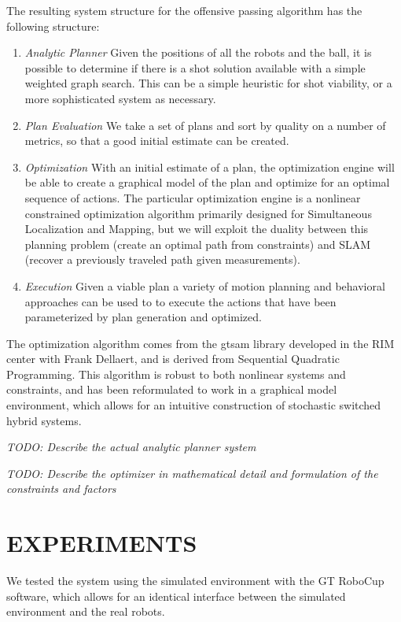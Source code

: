 \documentclass[a4paper, 10pt, conference]{ieeeconf}      %
\begin{document}
The resulting system structure for the offensive passing algorithm has the following structure:
\begin{enumerate}
 \item \textit{Analytic Planner} Given the positions of all the robots and the ball, it is possible to determine if there is a shot solution available with a simple weighted graph search. This can be a simple heuristic for shot viability, or a more sophisticated system as necessary.
 \item \textit{Plan Evaluation} We take a set of plans and sort by quality on a number of metrics, so that a good initial estimate can be created.
 \item \textit{Optimization} With an initial estimate of a plan, the optimization engine will be able to create a graphical model of the plan and optimize for an optimal sequence of actions. The particular optimization engine is a nonlinear constrained optimization algorithm primarily designed for Simultaneous Localization and Mapping, but we will exploit the duality between this planning problem (create an optimal path from constraints) and SLAM (recover a previously traveled path given measurements).
 \item \textit{Execution} Given a viable plan a variety of motion planning and behavioral approaches can be used to to execute the actions that have been parameterized by plan generation and optimized.  
\end{enumerate}

The optimization algorithm comes from the gtsam library\cite{Dellaert05rss} developed in the RIM center with Frank Dellaert, and is derived from Sequential Quadratic Programming. This algorithm is robust to both nonlinear systems and constraints, and has been reformulated to work in a graphical model environment, which allows for an intuitive construction of stochastic switched hybrid systems.

\textit{TODO: Describe the actual analytic planner system}

\textit{TODO: Describe the optimizer in mathematical detail and formulation of the constraints and factors}

\section{EXPERIMENTS}
We tested the system using the simulated environment with the GT RoboCup software, which allows for an identical interface between the simulated environment and the real robots.  
\end{document}
